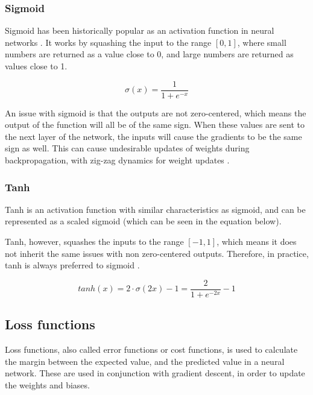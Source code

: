 \subsubsection{Sigmoid}

Sigmoid has been historically popular as an activation function in neural networks \cite{_neural_2018}. It works by squashing the input to the range $[0, 1]$, where small numbers are returned as a value close to 0, and large numbers are returned as values close to 1. 

\begin{equation} \label{eqn:sigmoid}
    \sigma(x) = \frac{1}{1 + e^{-x}}
\end{equation}

An issue with sigmoid is that the outputs are not zero-centered, which means the output of the function will all be of the same sign. When these values are sent to the next layer of the network, the inputs will cause the gradients to be the same sign as well. This can cause undesirable updates of weights during backpropagation, with zig-zag dynamics for weight updates \cite{_neural_2018}.

\subsubsection{Tanh}

Tanh is an activation function with similar characteristics as sigmoid, and can be represented as a scaled sigmoid (which can be seen in the equation below).

Tanh, however, squashes the inputs to the range $[-1, 1]$, which means it does not inherit the same issues with non zero-centered outputs. Therefore, in practice, tanh is always preferred to sigmoid \cite{_neural_2018}.

\begin{equation} \label{eqn:tanh}
    tanh(x) = 2 \cdot \sigma(2x) - 1 = \frac{2}{1+e^{-2x}} -1
\end{equation}

\subsection{Loss functions}
\label{loss_function}

Loss functions, also called error functions or cost functions, is used to calculate the margin between the expected value, and the predicted value in a neural network. These are used in conjunction with gradient descent, in order to update the weights and biases.

